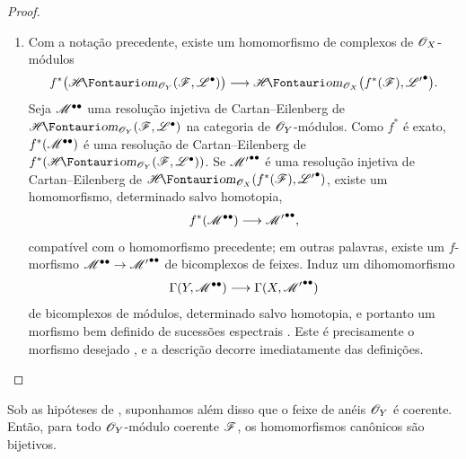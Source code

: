\begin{proof}
\begin{enumerate}
  \item[\rm(ii)]
  Com a notação precedente, existe um homomorfismo de complexos de
  $\mathscr{O}_X$-módulos
  \[
    f^*\bigl(\shHom_{\sh{O}_Y}(\sh{F},\sh{L}^\bullet)\bigr)
    \longrightarrow
    \shHom_{\sh{O}_X}
      \bigl(f^*(\sh{F}),{\sh{L}'}^\bullet\bigr).
  \]
  Seja $\mathscr{M}^{\bullet\bullet}$ uma resolução injetiva de
  Cartan--Eilenberg de
  $\shHom_{\sh{O}_Y}(\sh{F},\sh{L}^\bullet)$ na categoria de
  $\mathscr{O}_Y$-módulos.  Como $f^*$ é exato,
  $f^*(\mathscr{M}^{\bullet\bullet})$ é uma resolução de Cartan--Eilenberg de
  $f^*(\shHom_{\sh{O}_Y}(\sh{F},\sh{L}^\bullet))$.
  Se ${\mathscr{M}'}^{\bullet\bullet}$ é uma resolução injetiva de
  Cartan--Eilenberg de
  $\shHom_{\sh{O}_X}(f^*(\sh{F}),{\sh{L}'}^\bullet)$, existe
   um homomorfismo, determinado salvo homotopia,
  \[
    f^*(\mathscr{M}^{\bullet\bullet})
    \longrightarrow{\mathscr{M}'}^{\bullet\bullet},
  \]
  compatível com o homomorfismo precedente; em outras palavras, existe
  um $f$-morfismo
  $\sh{M}^{\bullet\bullet}\to{\sh{M}'}^{\bullet\bullet}$ de
  bicomplexos de feixes.
  Induz um dihomomorfismo
  \[
    \Gamma(Y,\mathscr{M}^{\bullet\bullet})
    \longrightarrow\Gamma(X,{\mathscr{M}'}^{\bullet\bullet})
  \]
  de bicomplexos de módulos, determinado salvo homotopia, e portanto
  um morfismo bem definido de sucessões espectrais
  .  Este é precisamente o morfismo desejado
  , e a descrição
   decorre imediatamente das definições.
\end{enumerate}
\end{proof}

\begin{proposition}[12.3.5]
\label{0.12.3.5}
Sob as hipóteses de , suponhamos além disso que o
feixe de anéis $\mathscr{O}_Y$ é coerente.
Então, para todo $\mathscr{O}_Y$-módulo coerente $\mathscr{F}$, os
homomorfismos canônicos  são bijetivos.
\end{proposition}

